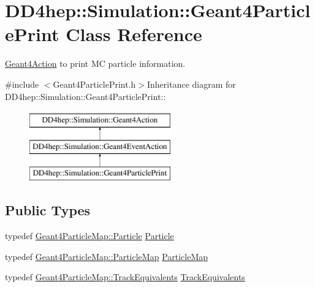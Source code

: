 \hypertarget{class_d_d4hep_1_1_simulation_1_1_geant4_particle_print}{
\section{DD4hep::Simulation::Geant4ParticlePrint Class Reference}
\label{class_d_d4hep_1_1_simulation_1_1_geant4_particle_print}
}


\hyperlink{class_d_d4hep_1_1_simulation_1_1_geant4_action}{Geant4Action} to print MC particle information.  


{\ttfamily \#include $<$Geant4ParticlePrint.h$>$}Inheritance diagram for DD4hep::Simulation::Geant4ParticlePrint::\begin{figure}[H]
\begin{center}
\leavevmode
\includegraphics[height=3cm]{class_d_d4hep_1_1_simulation_1_1_geant4_particle_print}
\end{center}
\end{figure}
\subsection*{Public Types}
\begin{DoxyCompactItemize}
\item 
typedef \hyperlink{class_d_d4hep_1_1_simulation_1_1_geant4_particle}{Geant4ParticleMap::Particle} \hyperlink{class_d_d4hep_1_1_simulation_1_1_geant4_particle_print_a0d1712b05821d64c3f75e6226f553aa2}{Particle}
\item 
typedef \hyperlink{class_d_d4hep_1_1_simulation_1_1_geant4_particle_map_a065c5fb0629285022b9aa2a628bffef3}{Geant4ParticleMap::ParticleMap} \hyperlink{class_d_d4hep_1_1_simulation_1_1_geant4_particle_print_a1c6a9ccb9393484ee16c7cd344e20f4a}{ParticleMap}
\item 
typedef \hyperlink{class_d_d4hep_1_1_simulation_1_1_geant4_particle_map_aba09f5fcb2dd5874d129660ad4454a21}{Geant4ParticleMap::TrackEquivalents} \hyperlink{class_d_d4hep_1_1_simulation_1_1_geant4_particle_print_af3d655fbfb9d0a270a3df703205c4b5b}{TrackEquivalents}
\end{DoxyCompactItemize}
